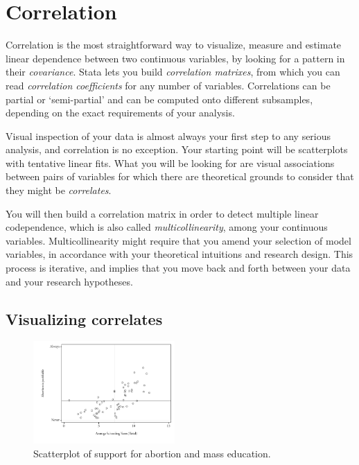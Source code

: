 %
%
%
\section{Correlation}%
  \label{sec:correlation}

Correlation is the most straightforward way to visualize, measure and estimate linear dependence between two continuous variables, by looking for a pattern in their \emph{covariance}. Stata lets you build \emph{correlation matrixes}, from which you can read \emph{correlation coefficients} for any number of variables. Correlations can be partial or `semi-partial' and can be computed onto different subsamples, depending on the exact requirements of your analysis.%

Visual inspection of your data is almost always your first step to any serious analysis, and correlation is no exception. Your starting point will be scatterplots with tentative linear fits. What you will be looking for are visual associations between pairs of variables for which there are theoretical grounds to consider that they might be \emph{correlates}.%

You will then build a correlation matrix in order to detect multiple linear codependence, which is also called \emph{multicollinearity}, among your continuous variables. Multicollinearity might require that you amend your selection of model variables, in accordance with your theoretical intuitions and research design. This process is iterative, and implies that you move back and forth between your data and your research hypotheses.%


  \subsection{Visualizing correlates}%

  \begin{figure}
    \begin{center}
      \includegraphics[width=0.48\textwidth]{images/abortion_sc_means.pdf}
    \end{center}
    	\caption[Linear correlation]{\label{fig:correlation_scatterplot}%
  	Scatterplot of support for abortion and mass education. %
    \qog}
  \end{figure}%

